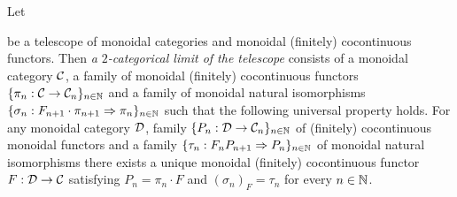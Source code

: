 \begin{definition}
Let 
\begin{center}   
\end{center}
be a telescope of monoidal categories and monoidal (finitely) cocontinuous functors. Then \textit{a $2$-categorical limit of the telescope} consists of a monoidal category ${\mathcal C}$, a family of monoidal (finitely) cocontinuous functors $\{\pi_n:{\mathcal C}\rightarrow {\mathcal C}_n\}_{n\in {\mathbb N}}$ and a family of monoidal natural isomorphisms $\{\sigma_n:F_{n+1} \cdot \pi_{n+1}\Rightarrow \pi_n\}_{n\in {\mathbb N}}$ such that the following universal property holds. For any monoidal category ${\mathcal D}$, family $\{P_n:{\mathcal D}\rightarrow {\mathcal C}_n\}_{n\in {\mathbb N}}$ of (finitely) cocontinuous monoidal functors and a family $\{\tau_n:F_nP_{n+1}\Rightarrow P_{n}\}_{n\in {\mathbb N}}$ of monoidal natural isomorphisms there exists a unique monoidal (finitely) cocontinuous functor $F:{\mathcal D}\rightarrow {\mathcal C}$ satisfying $P_n = \pi_n \cdot F$ and $\left(\sigma_n\right)_F = \tau_n$ for every $n\in {\mathbb N}$.
\end{definition}

